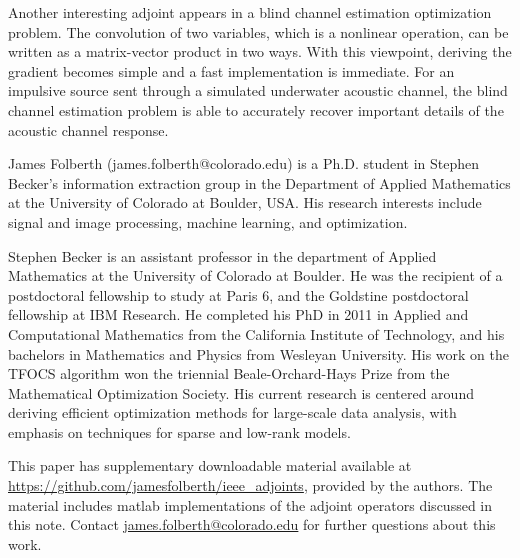 \documentclass[journal]{IEEEtran}
\begin{document}
Another interesting adjoint appears in a blind channel estimation optimization problem.  The convolution of two variables, which is a nonlinear operation, can be written as a matrix-vector product in two ways.  With this viewpoint, deriving the gradient becomes simple and a fast implementation is immediate.  For an impulsive source sent through a simulated underwater acoustic channel, the blind channel estimation problem is able to accurately recover important details of the acoustic channel response.





\begin{IEEEbiographynophoto}{James Folberth}
(james.folberth@colorado.edu) is a Ph.D. student in Stephen Becker's information extraction group in the Department of Applied Mathematics at the University of Colorado at Boulder, USA.  His research interests include signal and image processing, machine learning, and optimization.
\end{IEEEbiographynophoto}

\begin{IEEEbiographynophoto}{Stephen Becker} is an assistant professor in the department of Applied Mathematics at  the University of Colorado at Boulder. He was the recipient of a postdoctoral fellowship to study at Paris 6, and the Goldstine postdoctoral fellowship at IBM Research. He completed his PhD in 2011 in Applied and Computational Mathematics from the California Institute of Technology, and his bachelors in Mathematics and Physics from Wesleyan University. His work on the TFOCS algorithm won the triennial Beale-Orchard-Hays Prize from the Mathematical Optimization Society.
   His current research is centered around deriving efficient optimization methods for large-scale data analysis, with emphasis on techniques for sparse and low-rank models.
\end{IEEEbiographynophoto}

This paper has supplementary downloadable material available at \url{https://github.com/jamesfolberth/ieee_adjoints}, provided by the authors. The material includes {\sc matlab} implementations of the adjoint operators discussed in this note. Contact \url{james.folberth@colorado.edu} for further questions about this work.
\end{document}
